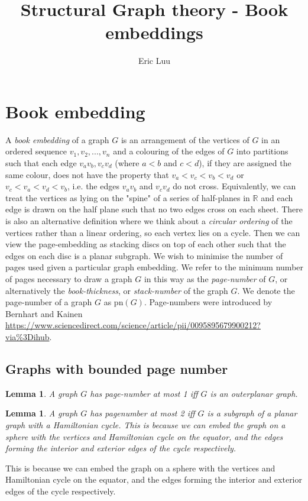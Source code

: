 \documentclass[]{article}
\title{Structural Graph theory - Book embeddings}
\author{Eric Luu}
\newcommand{\pn}{\text{pn}}
\newtheorem{lemma}[theorem]{Lemma}
\theoremstyle{definition}
\numberwithin{theorem}{section}
\numberwithin{equation}{section}
\begin{document}
\maketitle

\section{Book embedding}
A \textit{book embedding} of a graph $G$ is an arrangement of the vertices of $G$ in an ordered sequence $v_1, v_2, ..., v_n$ and a colouring of the edges of $G$ into partitions such that each edge $v_av_b, v_c v_d$ (where $a < b$ and $c < d$), if they are assigned the same colour, does not have the property that $v_a < v_c < v_b < v_d$ or $v_c < v_a < v_d < v_b$, i.e. the edges $v_a v_b$ and $v_c v_d$ do not cross. Equivalently, we can treat the vertices as lying on the "spine" of a series of half-planes in $\mathbb{R}$ and each edge is drawn on the half plane such that no two edges cross on each sheet. There is also an alternative definition where we think about a \textit{circular ordering} of the vertices rather than a linear ordering, so each vertex lies on a cycle. Then we can view the page-embedding as stacking discs on top of each other such that the edges on each disc is a planar subgraph. We wish to minimise the number of pages used given a particular graph embedding. We refer to the minimum number of pages necessary to draw a graph $G$ in this way as the \textit{page-number} of $G$, or alternatively the \textit{book-thickness}, or \textit{stack-number} of the graph $G$. We denote the page-number of a graph $G$ as $\pn(G)$. Page-numbers were introduced by Bernhart and Kainen \url{https://www.sciencedirect.com/science/article/pii/0095895679900212?via%3Dihub}.
\subsection{Graphs with bounded page number}
\begin{lemma}
	A graph $G$ has page-number at most 1 iff $G$ is an outerplanar graph.
\end{lemma}

\begin{lemma}
	A graph $G$ has pagenumber at most 2 iff $G$ is a subgraph of a planar graph with a Hamiltonian cycle. This is because we can embed the graph on a sphere with the vertices and Hamiltonian cycle on the equator, and the edges forming the interior and exterior edges of the cycle respectively.
\end{lemma}
This is because we can embed the graph on a sphere with the vertices and Hamiltonian cycle on the equator, and the edges forming the interior and exterior edges of the cycle respectively.
\end{document}
